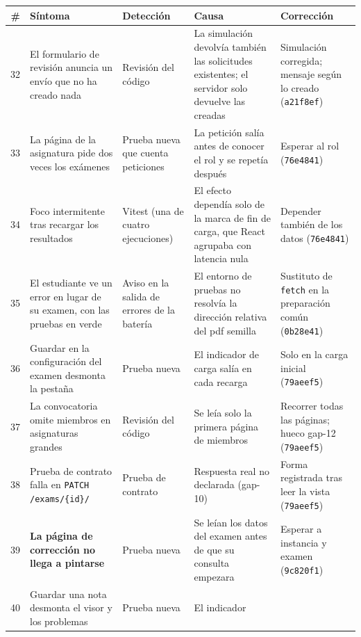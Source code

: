 \begin{table}[htbp]
  \centering
  \scriptsize
  \begin{tabular}{rp{}p{}p{}p{}}
    \toprule
    \textbf{\#} & \textbf{Síntoma} & \textbf{Detección} & \textbf{Causa} & \textbf{Corrección} \\
    \midrule
    32 & El formulario de revisión anuncia un envío que no ha creado nada & Revisión del
      código & La simulación devolvía también las solicitudes existentes; el servidor solo
      devuelve las creadas & Simulación corregida; mensaje según lo creado
      (\texttt{a21f8ef}) \\
    33 & La página de la asignatura pide dos veces los exámenes & Prueba nueva que cuenta
      peticiones & La petición salía antes de conocer el rol y se repetía después &
      Esperar al rol (\texttt{76e4841}) \\
    34 & Foco intermitente tras recargar los resultados & Vitest (una de cuatro
      ejecuciones) & El efecto dependía solo de la marca de fin de carga, que React
      agrupaba con latencia nula & Depender también de los datos (\texttt{76e4841}) \\
    35 & El estudiante ve un error en lugar de su examen, con las pruebas en verde & Aviso
      en la salida de errores de la batería & El entorno de pruebas no resolvía la
      dirección relativa del \acs{pdf} semilla & Sustituto de \texttt{fetch} en la
      preparación común (\texttt{0b28e41}) \\
    36 & Guardar en la configuración del examen desmonta la pestaña & Prueba nueva & El
      indicador de carga salía en cada recarga & Solo en la carga inicial
      (\texttt{79aeef5}) \\
    37 & La convocatoria omite miembros en asignaturas grandes & Revisión del código &
      Se leía solo la primera página de miembros & Recorrer todas las páginas; hueco
      gap-12 (\texttt{79aeef5}) \\
    38 & Prueba de contrato falla en \texttt{PATCH /exams/\{id\}/} & Prueba de contrato &
      Respuesta real no declarada (gap-10) & Forma registrada tras leer la vista
      (\texttt{79aeef5}) \\
    39 & \textbf{La página de corrección no llega a pintarse} & Prueba nueva & Se leían los
      datos del examen antes de que su consulta empezara & Esperar a instancia y examen
      (\texttt{9c820f1}) \\
    40 & Guardar una nota desmonta el visor y los problemas & Prueba nueva & El indicador

\end{tabular}
\end{table}
